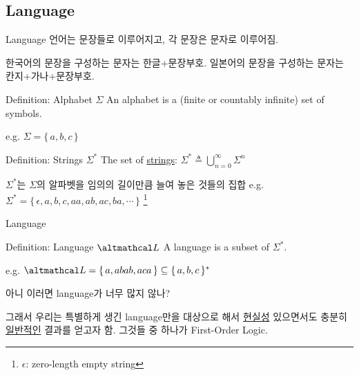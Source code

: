 \documentclass[../231120_msquare_computational-logic.tex]{subfiles}
\begin{document}
\subsection{Language}

\begin{frame}{Language}
    언어는 문장들로 이루어지고, 각 문장은 문자로 이루어짐.
    \begin{itemize}
        \ii 한국어의 문장을 구성하는 문자는 한글+문장부호.
        \ii 일본어의 문장을 구성하는 문자는 칸지+가나+문장부호.
    \end{itemize} \pause
    \begin{block}{Definition: Alphabet \(\Sigma\)}
        An alphabet is a (finite or countably infinite) set of symbols.
        \begin{itemize}
            \ii e.g. \(\Sigma = \{\,a,b,c\,\}\)
        \end{itemize}
    \end{block} \pause
    \begin{block}{Definition: Strings \(\Sigma^\ast\)}
        The set of \ul{strings}: \(\Sigma^\ast \triangleq \bigcup_{n=0}^\infty \Sigma^n\)
        \begin{itemize}
            \ii \(\Sigma^\ast\)는 \(\Sigma\)의 알파벳을 임의의 길이만큼 늘여 놓은 것들의 집합
            \ii e.g. \(\Sigma^\ast = \{\,\epsilon, a, b, c, a a, a b, a c, b a, \cdots\,\}\)
                \footnote{\(\epsilon\): zero-length empty string}
        \end{itemize}
    \end{block}
\end{frame}

\begin{frame}{Language}
    \begin{block}{Definition: Language \(\mcal L\)}
        A language is a subset of \(\Sigma^\ast\). 
        \begin{itemize}
            \ii e.g. \(\mcal L = \{\,a,abab, aca\,\} \subseteq \{\,a,b,c\,\}^\ast\)
        \end{itemize}
    \end{block} \pause

    \begin{alertblock}{}
        아니 이러면 language가 \alert{너무 많지 않나}? \pause
        \begin{itemize}
            \ii 그래서 우리는 특별하게 생긴 language만을 대상으로 해서
                \ul{현실성} 있으면서도 충분히 \ul{일반적인} 결과를 얻고자 함.
            \ii 그것들 중 하나가 \alert{First-Order Logic}.
        \end{itemize}
    \end{alertblock}
\end{frame}
\end{document}

